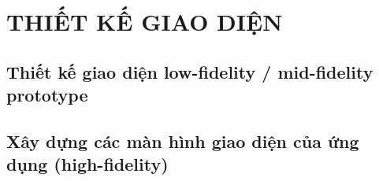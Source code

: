 \chapter{THIẾT KẾ GIAO DIỆN}\label{chap:giao-dien}

\section{Thiết kế giao diện low-fidelity / mid-fidelity prototype}
\pending

\section{Xây dựng các màn hình giao diện của ứng dụng (high-fidelity)}
\pending
